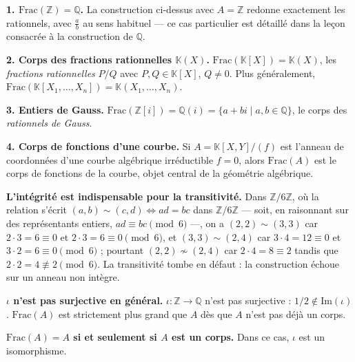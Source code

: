 \begin{mdframed}[style=exbar]
  \textbf{1. $\mathrm{Frac}(\mathbb{Z}) = \mathbb{Q}$.}\enspace%
  La construction ci-dessus avec $A=\mathbb{Z}$ redonne exactement les rationnels,
  avec $\tfrac{a}{b}$ au sens habituel — ce cas particulier est détaillé dans
  la leçon consacrée à la construction de $\mathbb{Q}$.

  \smallskip\noindent
  \textbf{2. Corps des fractions rationnelles $\mathbb{K}(X)$.}\enspace%
  $\mathrm{Frac}(\mathbb{K}[X]) = \mathbb{K}(X)$, les \emph{fractions rationnelles}
  $P/Q$ avec $P,Q\in\mathbb{K}[X]$, $Q\neq 0$.
  Plus généralement, $\mathrm{Frac}(\mathbb{K}[X_1,\ldots,X_n]) = \mathbb{K}(X_1,\ldots,X_n)$.

  \smallskip\noindent
  \textbf{3. Entiers de Gauss.}\enspace%
  $\mathrm{Frac}(\mathbb{Z}[i]) = \mathbb{Q}(i) = \{a+bi \mid a,b\in\mathbb{Q}\}$,
  le corps des \emph{rationnels de Gauss}.

  \smallskip\noindent
  \textbf{4. Corps de fonctions d'une courbe.}\enspace%
  Si $A = \mathbb{K}[X,Y]/(f)$ est l'anneau de coordonnées d'une courbe algébrique
  irréductible $f=0$, alors $\mathrm{Frac}(A)$ est le corps de fonctions de la courbe,
  objet central de la géométrie algébrique.
\end{mdframed}

\decsep{}



\begin{mdframed}[style=cexbar]
  \textbf{L'intégrité est indispensable pour la transitivité.}\enspace%
  Dans $\mathbb{Z}/6\mathbb{Z}$, où la relation s'écrit
  $(a,b)\sim(c,d)\iff ad=bc$ dans $\mathbb{Z}/6\mathbb{Z}$
  — soit, en raisonnant sur des représentants entiers,
  $ad\equiv bc\pmod 6$ —, on a
  $(2,2)\sim(3,3)$ car $2\cdot 3=6\equiv 0$ et $2\cdot 3=6\equiv 0\pmod 6$, et
  $(3,3)\sim(2,4)$ car $3\cdot 4=12\equiv 0$ et $3\cdot 2=6\equiv 0\pmod 6$ ;
  pourtant $(2,2)\not\sim(2,4)$ car $2\cdot 4=8\equiv 2$ tandis que
  $2\cdot 2=4\not\equiv 2\pmod 6$.
  La transitivité tombe en défaut : la construction échoue sur un anneau non intègre.

  \smallskip\noindent
  \textbf{$\iota$ n'est pas surjective en général.}\enspace%
  $\iota : \mathbb{Z} \to \mathbb{Q}$ n'est pas surjective : $1/2 \notin \mathrm{Im}(\iota)$.
  $\mathrm{Frac}(A)$ est strictement plus grand que $A$ dès que $A$ n'est pas
  déjà un corps.

  \smallskip\noindent
  \textbf{$\mathrm{Frac}(A) = A$ si et seulement si $A$ est un corps.}\enspace%
  Dans ce cas, $\iota$ est un isomorphisme.
\end{mdframed}

